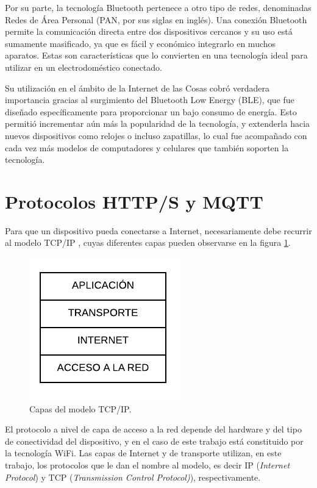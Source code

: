 Por su parte, la tecnología Bluetooth pertenece a otro tipo de redes, denominadas Redes de Área Personal (PAN, por sus siglas en inglés). Una conexión Bluetooth permite la comunicación directa entre dos dispositivos cercanos y su uso está sumamente masificado, ya que es fácil y económico integrarlo en muchos aparatos. Estas son características que lo convierten en una tecnología ideal para utilizar en un electrodoméstico conectado.

Su utilización en el ámbito de la Internet de las Cosas cobró verdadera importancia gracias al surgimiento del Bluetooth Low Energy (BLE), que fue diseñado específicamente para proporcionar un bajo consumo de energía. Esto permitió incrementar aún más la popularidad de la tecnología, y extenderla hacia nuevos dispositivos como relojes o incluso zapatillas, lo cual fue acompañado con cada vez más modelos de computadores y celulares que también soporten la tecnología.


\section{Protocolos HTTP/S y MQTT}

Para que un dispositivo pueda conectarse a Internet, necesariamente debe recurrir al modelo TCP/IP \citep{tcp_ip_model}, cuyas diferentes capas pueden observarse en la figura \ref{fig:modelo_tcp_ip}.

\begin{figure}[h]
\centering
\includegraphics{./Figures/modelo_tcp_ip.pdf}
\caption{Capas del modelo TCP/IP.}
\label{fig:modelo_tcp_ip}
\end{figure}

El protocolo a nivel de capa de acceso a la red depende del hardware y del tipo de conectividad del dispositivo, y en el caso de este trabajo está constituido por la tecnología WiFi. Las capas de Internet y de transporte utilizan, en este trabajo, los protocolos que le dan el nombre al modelo, es decir IP (\emph{Internet Protocol}) y TCP (\emph{Transmission Control Protocol)}), respectivamente.

